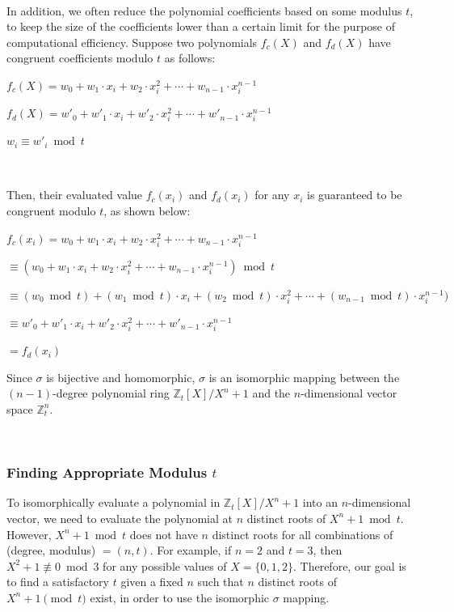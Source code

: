$ $

 In addition, we often reduce the polynomial coefficients based on some modulus $t$, to keep the size of the coefficients lower than a certain limit for the purpose of computational efficiency. Suppose two polynomials $f_c(X)$ and $f_d(X)$ have congruent coefficients modulo $t$ as follows:

$f_c(X) = w_0 + w_1\cdot x_i + w_2\cdot x_i^2 + \cdots + w_{n-1}\cdot x_i^{n-1}$

$f_d(X) = w'_0 + w'_1\cdot x_i + w'_2\cdot x_i^2 + \cdots + w'_{n-1}\cdot x_i^{n-1} $

$w_i \equiv w'_i \bmod t$

$ $

Then, their evaluated value $f_c(x_i)$ and $f_d(x_i)$ for any $x_i$ is guaranteed to be congruent modulo $t$, as shown below:

$f_c(x_i) = w_0 + w_1\cdot x_i + w_2\cdot x_i^2 + \cdots + w_{n-1}\cdot x_i^{n-1}$

$\equiv (w_0 + w_1\cdot x_i + w_2\cdot x_i^2 + \cdots + w_{n-1}\cdot x_i^{n-1}) \bmod t $

$\equiv (w_0  \bmod t) + (w_1  \bmod t)\cdot x_i + (w_2  \bmod t)\cdot x_i^2 + \cdots + (w_{n-1} \bmod t)\cdot x_i^{n-1}) $

$\equiv w'_0 + w'_1\cdot x_i + w'_2\cdot x_i^2 + \cdots + w'_{n-1}\cdot x_i^{n-1} $

$= f_d(x_i)$

 Since $\sigma$ is bijective and homomorphic, $\sigma$ is an isomorphic mapping between the $(n-1)$-degree polynomial ring $\mathbb{Z}_t[X]/X^n + 1$ and the $n$-dimensional vector space $\mathbb{Z}_t^n$. 


$ $


\subsubsection{Finding Appropriate Modulus $t$} 
\label{subsubsec:poly-vector-transformation-modulus}

To isomorphically evaluate a polynomial in $\mathbb{Z}_t[X]/X^n + 1$ into an $n$-dimensional vector, we need to evaluate the polynomial at $n$ distinct roots of $X^n + 1 \bmod t$. However, $X^n + 1 \bmod t$ does not have $n$ distinct roots for all combinations of (degree, modulus) $ = (n, t)$. For example, if $n = 2$ and $t = 3$, then $X^2+ 1 \not\equiv 0 \bmod 3$ for any possible values of $X = \{0, 1, 2\}$. Therefore, our goal is to find a satisfactory $t$ given a fixed $n$ such that $n$ distinct roots of $X^n + 1 \pmod t$ exist, in order to use the isomorphic $\sigma$ mapping. 

